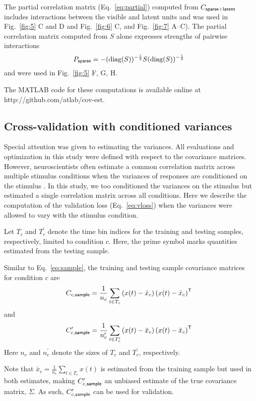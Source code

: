 The partial correlation matrix (Eq.~\ref{eq:partial}) computed from $C_{\sf sparse+latent}$ includes interactions between the visible and latent units and was used in Fig.~\ref{fig:5} C and D and Fig.~\ref{fig:6} C, and Fig.~\ref{fig:7} A--C).  The partial correlation matrix computed from $S$ alone expresses strengths of pairwise interactions
\begin{equation}
P_{\sf sparse} = -(\mbox{diag}(S))^{-\frac 1 2} S  (\mbox{diag}(S))^{-\frac 1 2}
\end{equation}
and were used in Fig.~\ref{fig:5} F, G, H.

The MATLAB code for these computations is available online at http://github.com/atlab/cov-est.
\subsection*{Cross-validation with conditioned variances}
Special attention was given to estimating the variances.  
All evaluations and optimization in this study were defined with respect to the covariance matrices.  
However, neuroscientists often estimate a common correlation matrix across multiple stimulus conditions when the variances of responses are conditioned on the stimulus \cite{Vogels:1989, Ponce:2013}. In this study, we too conditioned the variances on the stimulus but estimated a single correlation matrix across all conditions.
Here we describe the computation of the validation loss (Eq.~\ref{eq:vloss}) when the variances were allowed to vary with the stimulus condition.

Let $T_c$ and $T_c^\prime$ denote the time bin indices for the training and testing samples, respectively, limited to condition $c$. Here, the prime symbol marks quantities estimated from the testing sample.

Similar to Eq.~\ref{eq:sample}, the training and testing sample covariance matrices for condition $c$ are
\begin{equation}
    C_{c,{\sf sample}}
    = \frac 1{n_c} \sum\limits_{t\in T_c}\left(x(t)-\bar x_c\right)\left(x(t)-\bar x_c\right)^{\sf T}
\end{equation}
and
\begin{equation}
    C_{c,{\sf sample}}^\prime
    = \frac 1{n_c^\prime} \sum\limits_{t\in T_c^\prime}\left(x(t)-\bar x_c\right)\left(x(t)-\bar x_c\right)^{\sf T}
\end{equation}
Here $n_c$ and $n_c^\prime$ denote the sizes of $T_c$ and $T_c^\prime$, respectively.

Note that $\bar x_c= \frac 1 {n_c} \sum\limits_{t \in T_c}x(t)$ is estimated from the training sample but used in both estimates, making $C_{c,\sf sample}^\prime$ an unbiased estimate of the true covariance matrix, $\Sigma$. As such, $C_{c,\sf sample}^\prime$ can be used for validation.

